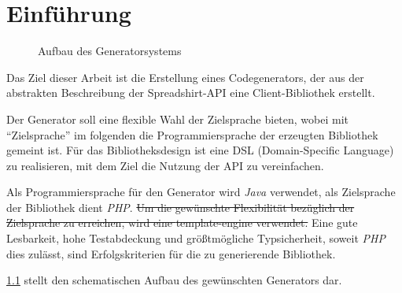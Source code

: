 \chapter{Einführung}
\label{chap:introduction}


\begin{figure}[b]
    \centering
    \resizebox{\textwidth}{!}{
        
    }
    \caption{Aufbau des Generatorsystems}
    \label{fig:generatorstructure}
\end{figure}        

Das Ziel dieser Arbeit ist die Erstellung eines Codegenerators, der aus der abstrakten Beschreibung der Spreadshirt-API eine Client-Bibliothek erstellt.

Der Generator soll eine flexible Wahl der Zielsprache bieten, wobei mit \enquote{Zielsprache} im folgenden die Programmiersprache der erzeugten Bibliothek gemeint ist. 
Für das Bibliotheksdesign ist eine \gls{DSL} (Domain-Specific Language) zu realisieren, mit dem Ziel die Nutzung der \gls{API} zu vereinfachen. 

Als Programmiersprache für den Generator wird \emph{Java} verwendet, als Zielsprache der Bibliothek dient \emph{PHP}. 
\sout{Um die gewünschte Flexibilität bezüglich der Zielsprache zu erreichen, wird eine \gls{template-engine} verwendet.}
Eine gute Lesbarkeit, hohe Testabdeckung und größtmögliche Typsicherheit, soweit \emph{PHP} dies zulässt, sind Erfolgskriterien für die zu generierende Bibliothek.

\cref{fig:generatorstructure} stellt den schematischen Aufbau des gewünschten Generators dar.




